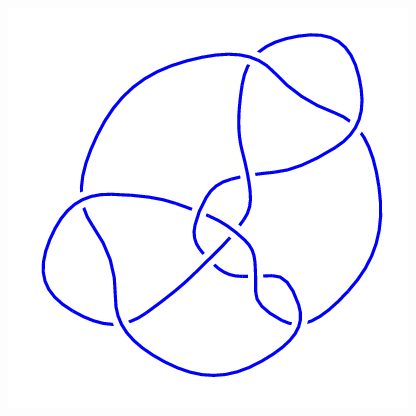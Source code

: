 \begin{figure}[H]
\begin{minipage}[b]{.18\linewidth}
    \end{minipage}
    \begin{minipage}[b]{.18\linewidth}
        \centering
        \includegraphics[width=\linewidth]{../data/10_156.png}
    \end{minipage}
\end{figure}
